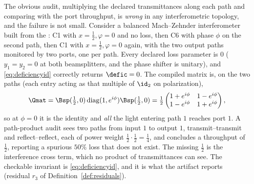 
\begin{remark}
\label{rem:wrongcheck}
The obvious audit, multiplying the declared transmittances along each path and
comparing with the port throughput, is \emph{wrong} in any interferometric
topology, and the failure is not small. Consider a balanced Mach--Zehnder
interferometer built from the : C1 with
$x=\tfrac12,\varphi=0$ and no loss, then C6 with phase $\phi$ on the second
path, then C1 with $x=\tfrac12,\varphi=0$ again, with the two output paths
monitored by two ports, one per path. Every declared loss parameter is $0$
($y_1=y_2=0$ at both beamsplitters, and the phase shifter is unitary), and
\eqref{eq:deficiencyid} correctly returns $\defic=0$. The compiled matrix is,
on the two paths (each entry acting as that multiple of $\id_2$ on
polarization),
\begin{equation}\label{eq:mz}
  \Gmat=\Bsp(\tfrac12,0)\operatorname{diag}(1,e^{i\phi})\Bsp(\tfrac12,0)
  =\tfrac12\begin{pmatrix}1+e^{i\phi}&1-e^{i\phi}\\
                          1-e^{i\phi}&1+e^{i\phi}\end{pmatrix},
\end{equation}
so at $\phi=0$ it is the identity and \emph{all} the light entering path $1$
reaches port $1$. A path-product audit sees two paths from input $1$ to output
$1$, transmit--transmit and reflect--reflect, each of power weight
$\tfrac12\cdot\tfrac12=\tfrac14$, and concludes a throughput of $\tfrac12$,
reporting a spurious $50\%$ loss that does not exist. The missing $\tfrac12$ is
the interference cross term, which no product of transmittances can see. The
checkable invariant is \eqref{eq:deficiencyid}, and it is what the artifact
reports (residual $r_3$ of Definition~\ref{def:residuals}).
\end{remark}
